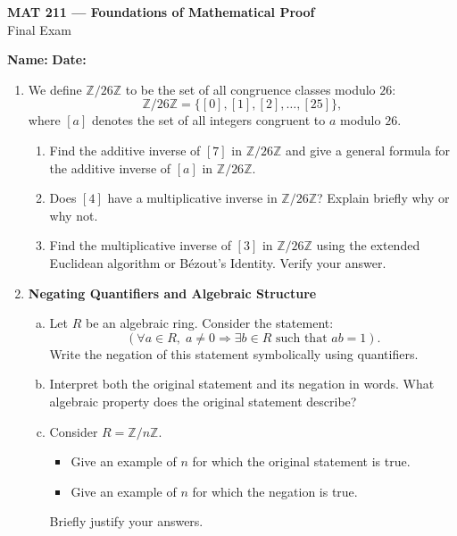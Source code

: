 \documentclass[12pt]{article}
\newcommand{\Z}{\mathbb{Z}}
\begin{document}
\begin{center}
  {\large \textbf{MAT 211 --- Foundations of Mathematical Proof}}\\[4pt]
  {\large Final Exam}
\end{center}

\bigskip
\noindent\textbf{Name:} \hrulefill \hspace{2cm}
\textbf{Date:} \hrulefill

\bigskip
\begin{enumerate}

\item 
We define $\mathbb{Z}/26\mathbb{Z}$ to be the set of all congruence classes modulo $26$:
\[
\mathbb{Z}/26\mathbb{Z} = \{[0],[1],[2],\dots,[25]\},
\]
where $[a]$ denotes the set of all integers congruent to $a$ modulo $26$.

\begin{enumerate}
    \item Find the additive inverse of $[7]$ in $\Z/26\Z$ and give a general
            formula for the additive inverse of $[a]$ in $\Z/26\Z$.    

    \item Does $[4]$ have a multiplicative inverse in $\Z/26\Z$?
    Explain briefly why or why not.
    
    \item Find the multiplicative inverse of $[3]$ in $\Z/26\Z$ using
    the extended Euclidean algorithm or Bézout's Identity.
    Verify your answer.

\end{enumerate}

\bigskip

\item \textbf{Negating Quantifiers and Algebraic Structure}

\begin{enumerate}[(a)]

\item Let $R$ be an algebraic ring.  Consider the statement:
\[
(\forall a \in R,\; a \neq 0 \Rightarrow \exists b \in R \text{ such that } ab = 1).
\]
Write the negation of this statement symbolically using quantifiers.

\item Interpret both the original statement and its negation in words.
What algebraic property does the original statement describe?

\item Consider $R = \mathbb{Z}/n\mathbb{Z}$.
\begin{itemize}
\item Give an example of $n$ for which the original statement is true.
\item Give an example of $n$ for which the negation is true.
\end{itemize}
Briefly justify your answers.


\end{enumerate}
\end{enumerate}
\end{document}
